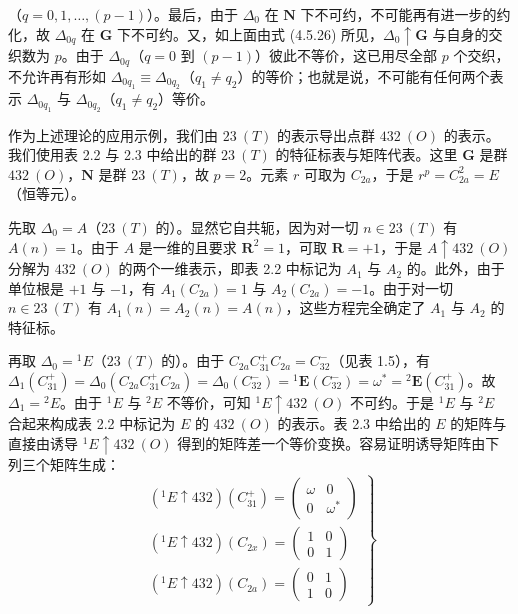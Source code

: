 （$q = 0, 1, \dots, (p-1)$）。最后，由于 $\Delta_{0}$ 在 $\mathbf{N}$ 下不可约，不可能再有进一步的约化，故 $\Delta_{0q}$ 在 $\mathbf{G}$ 下不可约。又，如上面由式 (4.5.26) 所见，$\Delta_{0} \uparrow \mathbf{G}$ 与自身的交织数为 $p$。由于 $\Delta_{0q}$（$q = 0$ 到 $(p-1)$）彼此不等价，这已用尽全部 $p$ 个交织，不允许再有形如 $\Delta_{0q_{1}} \equiv \Delta_{0q_{2}}$（$q_{1} \neq q_{2}$）的等价；也就是说，不可能有任何两个表示 $\Delta_{0q_{1}}$ 与 $\Delta_{0q_{2}}$（$q_{1} \neq q_{2}$）等价。

作为上述理论的应用示例，我们由 $23\ (T)$ 的表示导出点群 $432\ (O)$ 的表示。我们使用表 2.2 与 2.3 中给出的群 $23\ (T)$ 的特征标表与矩阵代表。这里 $\mathbf{G}$ 是群 $432\ (O)$，$\mathbf{N}$ 是群 $23\ (T)$，故 $p = 2$。元素 $r$ 可取为 $C_{2a}$，于是 $r^{p} = C^{2}_{2a} = E$（恒等元）。

先取 $\Delta_{0} = A$（$23\ (T)$ 的）。显然它自共轭，因为对一切 $n \in 23\ (T)$ 有 $A(n) = 1$。由于 $A$ 是一维的且要求 $\mathbf{R}^{2} = 1$，可取 $\mathbf{R} = +1$，于是 $A \uparrow 432\ (O)$ 分解为 $432\ (O)$ 的两个一维表示，即表 2.2 中标记为 $A_{1}$ 与 $A_{2}$ 的。此外，由于单位根是 $+1$ 与 $-1$，有 $A_{1}(C_{2a}) = 1$ 与 $A_{2}(C_{2a}) = -1$。由于对一切 $n \in 23\ (T)$ 有 $A_{1}(n) = A_{2}(n) = A(n)$，这些方程完全确定了 $A_{1}$ 与 $A_{2}$ 的特征标。

再取 $\Delta_{0} = {}^{1}E$（$23\ (T)$ 的）。由于 $C_{2a}C^{+}_{31}C_{2a} = C^{-}_{32}$（见表 1.5），有 $\Delta_{1}(C^{+}_{31}) = \Delta_{0}(C_{2a}C^{+}_{31}C_{2a}) = \Delta_{0}(C^{-}_{32}) = {}^{1}\mathbf{E}(C^{-}_{32}) = \omega^{*} = {}^{2}\mathbf{E}(C^{+}_{31})$。故 $\Delta_{1} = {}^{2}E$。由于 ${}^{1}E$ 与 ${}^{2}E$ 不等价，可知 ${}^{1}E \uparrow 432\ (O)$ 不可约。于是 ${}^{1}E$ 与 ${}^{2}E$ 合起来构成表 2.2 中标记为 $E$ 的 $432\ (O)$ 的表示。表 2.3 中给出的 $E$ 的矩阵与直接由诱导 ${}^{1}E \uparrow 432\ (O)$ 得到的矩阵差一个等价变换。容易证明诱导矩阵由下列三个矩阵生成：
\begin{equation*}
\left.
\begin{array}{l}
\left({}^{1}E \uparrow 432\right)(C^{+}_{31}) = \begin{pmatrix} \omega & 0\\ 0 & \omega^{*} \end{pmatrix}\\[2ex]
\left({}^{1}E \uparrow 432\right)(C_{2x}) = \begin{pmatrix} 1 & 0\\ 0 & 1 \end{pmatrix}\\[2ex]
\left({}^{1}E \uparrow 432\right)(C_{2a}) = \begin{pmatrix} 0 & 1\\ 1 & 0 \end{pmatrix}
\end{array}
\right\}
\tag{4.5.46}
\end{equation*}

